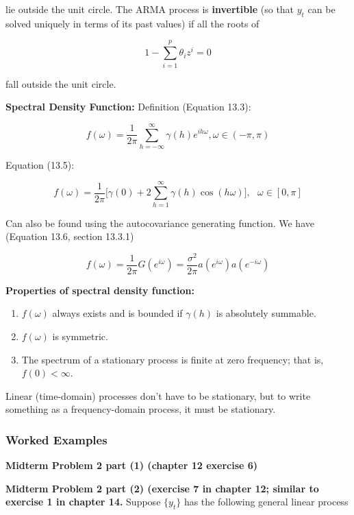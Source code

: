 lie outside the unit circle. The ARMA process is \textbf{invertible} (so that \(y_t\) can be solved uniquely in terms of its past values) if all the roots of 

\[
1 - \sum_{i=1}^p \theta_i z^i = 0
\]

fall outside the unit circle.

\textbf{Spectral Density Function:} Definition (Equation 13.3):

\[
f(\omega) = \frac{1}{2 \pi} \sum_{h = - \infty}^\infty \gamma(h) e^{i h \omega}, \omega \in (-\pi, \pi)
\]

Equation (13.5):

\[
f(\omega) = \frac{1}{2\pi} \bigg[ \gamma(0) + 2 \sum_{h=1}^\infty \gamma(h) \cos(h \omega) \bigg], \ \ \ \omega \in [0, \pi]
\]

Can also be found using the autocovariance generating function. We have (Equation 13.6, section 13.3.1)

\[
f(\omega) = \frac{1}{2\pi}G(e^{i \omega}) = \frac{\sigma^2}{2 \pi} a(e^{i \omega}) a(e^{- i \omega})
\]

\textbf{Properties of spectral density function:}

\begin{enumerate}[(1)]

\item \(f(\omega)\) always exists and is bounded if \(\gamma(h)\) is absolutely summable.

\item \(f(\omega)\) is symmetric.

\item The spectrum of a stationary process is finite at zero frequency; that is, \(f(0) < \infty\).

\end{enumerate}

Linear (time-domain) processes don't have to be stationary, but to write something as a frequency-domain process, it must be stationary.

\subsubsection{Worked Examples}\label{ts.ch13.examples}


\textbf{Midterm Problem 2 part (1) (chapter 12 exercise 6)}

\textbf{Midterm Problem 2 part (2) (exercise 7 in chapter 12; similar to exercise 1 in chapter 14.} Suppose \(\{y_t\}\) has the following general linear process

